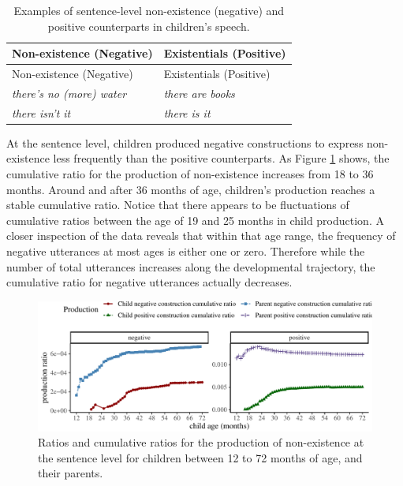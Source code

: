 \documentclass[
  english,
  man,floatsintext]{apa6}
\begin{document}
\begin{longtable}[]{@{}ll@{}}
\caption{\label{tab:nonexist} Examples of sentence-level non-existence (negative) and positive counterparts in children's speech.}\tabularnewline
\toprule
Non-existence (Negative) & Existentials (Positive) \\
\midrule
\endfirsthead
\toprule
Non-existence (Negative) & Existentials (Positive) \\
\midrule
\endhead
\emph{there's no (more) water} & \emph{there are books} \\
\emph{there isn't it} & \emph{there is it} \\
\bottomrule
\end{longtable}

At the sentence level, children produced negative constructions to express non-existence less frequently than the positive counterparts. As Figure \ref{fig:existence} shows, the cumulative ratio for the production of non-existence increases from 18 to 36 months. Around and after 36 months of age, children's production reaches a stable cumulative ratio. Notice that there appears to be fluctuations of cumulative ratios between the age of 19 and 25 months in child production. A closer inspection of the data reveals that within that age range, the frequency of negative utterances at most ages is either one or zero. Therefore while the number of total utterances increases along the developmental trajectory, the cumulative ratio for negative utterances actually decreases.

\begin{figure}[H]

{\centering \includegraphics{neg_construction_article_files/figure-latex/existence-1} 

}

\caption{Ratios and cumulative ratios for the production of non-existence at the sentence level for children between 12 to 72 months of age, and their parents.}\label{fig:existence}
\end{figure}
\end{document}
